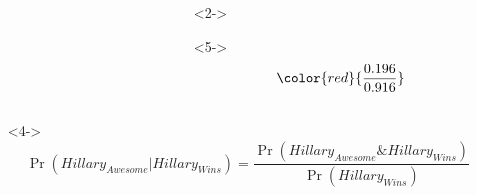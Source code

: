 \documentclass[xcolor={dvipsnames}]{beamer}
\begin{document}
\begin{frame}[fragile]
\begin{columns}
\begin{column}{.55\textwidth}
\begin{itemize}
\end{itemize}
\end{column}
\begin{column}{.45\textwidth}

\begin{itemize}
\item[]<2->
\vspace{-2em}
\tiny
{}
\item[]<5->
\large
\vspace{-1em}
$$\color{red}{\frac{0.196}{0.916}}$$

\end{itemize}
\end{column}
\end{columns}

\begin{itemize}
\item[]<4->
$$\Pr( Hillary_{Awesome} | Hillary_{Wins} ) = \frac{\Pr( Hillary_{Awesome} \& Hillary_{Wins}) }{\Pr(Hillary_{Wins})}$$
\end{itemize}


\end{frame}
\end{document}
